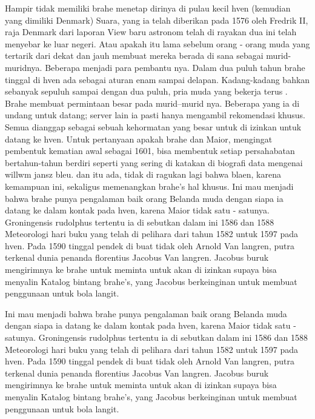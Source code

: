 Hampir tidak memiliki brahe menetap dirinya di pulau kecil hven (kemudian yang dimiliki Denmark) Suara, 
yang ia telah diberikan pada 1576 oleh Fredrik II, raja Denmark dari laporan View baru astronom telah di rayakan dua ini telah menyebar ke luar negeri. 
Atau apakah itu lama sebelum orang - orang muda yang tertarik dari dekat dan jauh membuat mereka berada di sana sebagai murid-muridnya. 
Beberapa menjadi para pembantu nya. Dalam dua puluh tahun brahe tinggal di hven ada sebagai aturan enam sampai delapan. 
Kadang-kadang bahkan sebanyak sepuluh sampai dengan dua puluh, pria muda yang bekerja terus . 
Brahe membuat permintaan besar pada murid–murid nya. Beberapa yang ia di undang untuk datang; server lain ia pasti hanya mengambil rekomendasi khusus. 
Semua dianggap sebagai sebuah kehormatan yang besar untuk di izinkan untuk datang ke hven. 
Untuk pertanyaan apakah brahe dan Maior, mengingat pembentuk kematian awal sebagai 1601, 
bisa membentuk setiap persahabatan bertahun-tahun berdiri seperti yang sering di katakan di biografi data mengenai willwm jansz bleu. 
dan itu ada, tidak di ragukan lagi bahwa blaen, karena kemampuan ini, sekaligus memenangkan brahe's hal khusus. 
Ini mau menjadi bahwa brahe punya pengalaman baik orang Belanda muda dengan siapa ia datang ke dalam kontak pada hven, 
karena Maior tidak satu - satunya. Groningensis rudolphus tertentu ia di sebutkan dalam ini 1586 dan 1588 Meteorologi 
hari buku yang telah di pelihara dari tahun 1582 untuk 1597 pada hven. 
Pada 1590 tinggal pendek di buat tidak oleh Arnold Van langren, 
putra terkenal dunia penanda florentius Jacobus Van langren. 
Jacobus buruk mengirimnya ke brahe untuk meminta untuk akan di izinkan supaya bisa menyalin Katalog bintang brahe's, 
yang Jacobus berkeinginan untuk membuat penggunaan untuk bola langit. 

Ini mau menjadi bahwa brahe punya pengalaman baik orang Belanda muda dengan siapa ia datang ke dalam kontak pada hven, 
karena Maior tidak satu - satunya. Groningensis rudolphus tertentu ia di sebutkan dalam ini 1586 dan 1588 Meteorologi 
hari buku yang telah di pelihara dari tahun 1582 untuk 1597 pada hven. 
Pada 1590 tinggal pendek di buat tidak oleh Arnold Van langren, 
putra terkenal dunia penanda florentius Jacobus Van langren. 
Jacobus buruk mengirimnya ke brahe untuk meminta untuk akan di izinkan supaya bisa menyalin Katalog bintang brahe's, 
yang Jacobus berkeinginan untuk membuat penggunaan untuk bola langit. 
\cite{Richter1939Willem}


